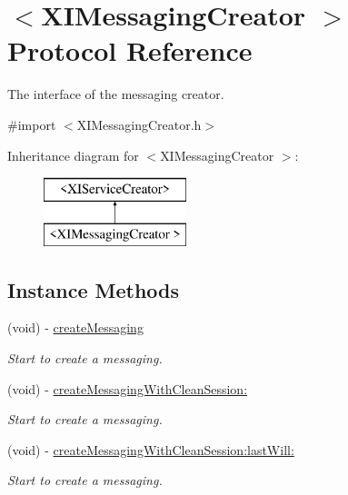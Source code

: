\hypertarget{protocol_x_i_messaging_creator_01-p}{}\section{$<$X\+I\+Messaging\+Creator $>$ Protocol Reference}
\label{protocol_x_i_messaging_creator_01-p}


The interface of the messaging creator.  




{\ttfamily \#import $<$X\+I\+Messaging\+Creator.\+h$>$}

Inheritance diagram for $<$X\+I\+Messaging\+Creator $>$\+:\begin{figure}[H]
\begin{center}
\leavevmode
\includegraphics[height=2.000000cm]{protocol_x_i_messaging_creator_01-p}
\end{center}
\end{figure}
\subsection*{Instance Methods}
\begin{DoxyCompactItemize}
\item 
(void) -\/ \hyperlink{protocol_x_i_messaging_creator_01-p_a9f3835053d9eda97c3ffbb03536dd794}{create\+Messaging}
\begin{DoxyCompactList}\small\item\em Start to create a messaging. \end{DoxyCompactList}\item 
(void) -\/ \hyperlink{protocol_x_i_messaging_creator_01-p_a0b22a598875adcfdbaf5b7a01788eb2c}{create\+Messaging\+With\+Clean\+Session\+:}
\begin{DoxyCompactList}\small\item\em Start to create a messaging. \end{DoxyCompactList}\item 
(void) -\/ \hyperlink{protocol_x_i_messaging_creator_01-p_ab776673e132b56a4cbe7a1ceb5c0888e}{create\+Messaging\+With\+Clean\+Session\+:last\+Will\+:}
\begin{DoxyCompactList}\small\item\em Start to create a messaging. \end{DoxyCompactList}\end{DoxyCompactItemize}
